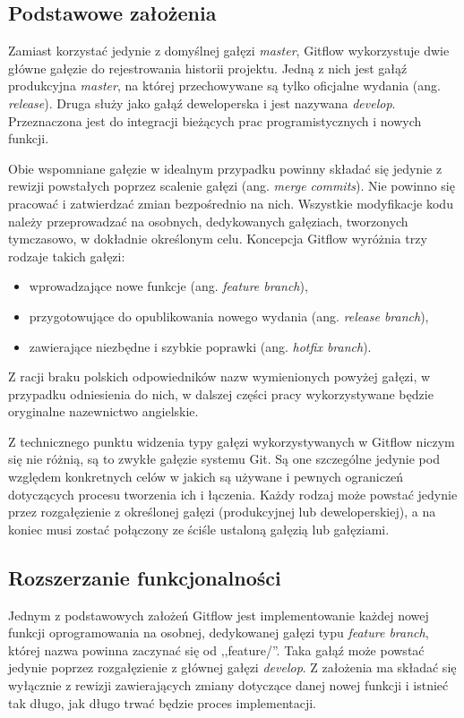 \documentclass[11pt,a4paper,polish,thesis]{dcsbook}
\begin{document}
	\subsection{Podstawowe założenia}
	
	Zamiast korzystać jedynie z domyślnej gałęzi \textit{master}, Gitflow wykorzystuje dwie główne gałęzie do rejestrowania historii projektu. Jedną z nich jest gałąź produkcyjna \textit{master}, na której przechowywane są tylko oficjalne wydania (ang. \textit{release}). Druga służy jako gałąź deweloperska i jest nazywana \textit{develop}. Przeznaczona jest do integracji bieżących prac programistycznych i nowych funkcji.
	
	Obie wspomniane gałęzie w idealnym przypadku powinny składać się jedynie z rewizji powstałych poprzez scalenie gałęzi (ang. \textit{merge commits}). Nie powinno się pracować i zatwierdzać zmian bezpośrednio na nich. Wszystkie modyfikacje kodu należy przeprowadzać na osobnych, dedykowanych gałęziach, tworzonych tymczasowo, w dokładnie określonym celu. Koncepcja Gitflow wyróżnia trzy rodzaje takich gałęzi:
	\begin{itemize}
		\item wprowadzające nowe funkcje (ang. \textit{feature branch}),
		\item przygotowujące do opublikowania nowego wydania (ang. \textit{release branch}),
		\item zawierające niezbędne i szybkie poprawki (ang. \textit{hotfix branch}).
	\end{itemize}
	Z racji braku polskich odpowiedników nazw wymienionych powyżej gałęzi, w przypadku odniesienia do nich, w dalszej części pracy wykorzystywane będzie oryginalne nazewnictwo angielskie.
	
	Z technicznego punktu widzenia typy gałęzi wykorzystywanych w Gitflow niczym się nie różnią, są to zwykłe gałęzie systemu Git. Są one szczególne jedynie pod względem konkretnych celów w jakich są używane i pewnych ograniczeń dotyczących procesu tworzenia ich i łączenia. Każdy rodzaj może powstać jedynie przez rozgałęzienie z określonej gałęzi (produkcyjnej lub deweloperskiej), a na koniec musi zostać połączony ze ściśle ustaloną gałęzią lub gałęziami.
	
	\subsection{Rozszerzanie funkcjonalności}
	
	Jednym z podstawowych założeń Gitflow jest implementowanie każdej nowej funkcji oprogramowania na osobnej, dedykowanej gałęzi typu \textit{feature branch}, której nazwa powinna zaczynać się od ,,feature/''. Taka gałąź może powstać jedynie poprzez rozgałęzienie z głównej gałęzi \textit{develop}. Z założenia ma składać się wyłącznie z rewizji zawierających zmiany dotyczące danej nowej funkcji i istnieć tak długo, jak długo trwać będzie proces implementacji.
	
\end{document}
